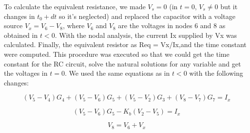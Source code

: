 To calculate  the equivalent resistance, we made $V_s=0$ (in $t=0$, $V_s\neq0$ but it changes in $t_0+dt$ so it's neglected) and replaced the capacitor with a voltage source $V_x= V_6-V_8$, where $V_6$ and $V_8$ are the voltages in nodes 6 and 8 as obtained in $t<0$. With the nodal analysis, the current Ix supplied by Vx was calculated. Finally, the equivalent resistor as Req = Vx/Ix,and the time constant were computed.
This procedure was executed so that we could get the time constant for the RC circuit, solve the natural solutions for any variable and get the voltages in $t=0$.
We used the same equations as in $t<0$ with the following changes:

\begin{equation}
  (V_5-V_4)G_4 + (V_5-V_6)G_5 + (V_5-V_2)G_3 + (V_8-V_7)G_7 = I_x
  \label{eq:Node5.2}
\end{equation}

\begin{equation}
  (V_5-V_6)G_5 - K_b(V_2-V_5) = I_x
  \label{eq:Node6.2}
\end{equation}

\begin{equation}
  V_8 = V_6 + V_x
  \label{eq:Equation9}
\end{equation}




